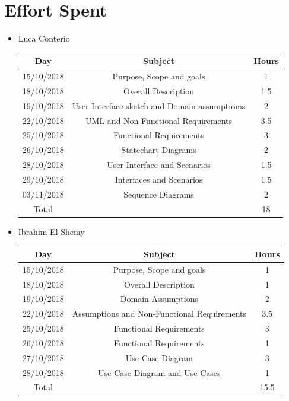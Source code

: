 \documentclass[12pt,a4paper]{article}
\begin{document}
	\section{Effort Spent}
	\begin{itemize}
		\item Luca Conterio
		\begin{center}
			\begin{tabular}{| c | c | c |}
				\hline
				Day & Subject & Hours \\ \hline
				15/10/2018 & Purpose, Scope and goals & 1 \\
				18/10/2018 & Overall Description & 1.5 \\
				19/10/2018  & User Interface sketch and Domain assumptioms & 2 \\
				22/10/2018  & UML and Non-Functional Requirements & 3.5 \\
				25/10/2018 & Functional Requirements & 3 \\
				26/10/2018 & Statechart Diagrams & 2 \\
				28/10/2018 & User Interface and Scenarios & 1.5 \\
				29/10/2018 & Interfaces and Scenarios & 1.5 \\
				03/11/2018 & Sequence Diagrams & 2 \\
				\hline
				Total & & 18 \\
				\hline
			\end{tabular}
		\end{center}
		
		\item Ibrahim El Shemy
		\begin{center}
			\begin{tabular}{| c | c | c |}
				\hline
				Day & Subject & Hours \\ \hline
				15/10/2018 & Purpose, Scope and goals & 1 \\
				18/10/2018 & Overall Description & 1 \\
				19/10/2018  & Domain Assumptions & 2 \\
				22/10/2018  & Assumptions and Non-Functional Requirements & 3.5 \\
				25/10/2018 & Functional Requirements & 3 \\
				26/10/2018 & Functional Requirements & 1 \\
				27/10/2018 & Use Case Diagram & 3 \\
				28/10/2018 & Use Case Diagram and Use Cases & 1 \\
				\hline
				Total & & 15.5 \\
				\hline
			\end{tabular}
		\end{center}
	\end{itemize}
\end{document}
